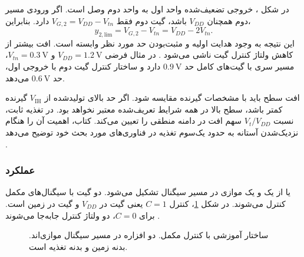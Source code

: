در شکل ، خروجی تضعیف‌شده واحد اول به
 واحد دوم وصل است. اگر ورودی مسیر دوم همچنان
\(V_{DD}\) باشد، گیت دوم فقط
\(V_{G,2}=V_{DD}-V_{tn}\) دارد. بنابراین،
\begin{equation}
 y_{2,\mathrm{lim}}=V_{G,2}-V_{tn}=V_{DD}-2V_{tn}.
 \label{eq:pass-gate-cascade}
\end{equation}
این نتیجه به وجود هدایت اولیه و مثبت‌بودن حد مورد نظر
وابسته است. افت بیشتر از کاهش ولتاژ کنترل گیت ناشی می‌شود
\cite[آغاز صفحه ۹۳]{weste}.
در مثال فرضی \(V_{DD}=\qty{1.2}{\volt}\) و
\(V_{tn}=\qty{0.3}{\volt}\)، مسیر سری با گیت‌های کامل حد
\(\qty{0.9}{\volt}\) دارد و ساختار کنترل گیت دوم با خروجی
اول، حد \(\qty{0.6}{\volt}\) می‌دهد.

افت سطح باید با مشخصات گیرنده مقایسه شود. اگر حد بالای
تولیدشده از \(V_{\mathrm{IH}}\) گیرنده کمتر باشد، سطح بالا
در همه شرایط تعریف‌شده معتبر نخواهد بود.
در تغذیه ثابت، نسبت \(V_t/V_{DD}\) سهم افت در دامنه منطقی
را تعیین می‌کند. کتاب، اهمیت آن را هنگام نزدیک‌شدن آستانه
به حدود یک‌سوم تغذیه در فناوری‌های مورد بحث خود توضیح
می‌دهد \cite[صفحه ۹۳]{weste}.

\subsubsection{عملکرد }
\label{sec:pass-transmission-gate}
 یا  از یک  و یک
 موازی در مسیر سیگنال تشکیل می‌شود. دو گیت با
سیگنال‌های مکمل کنترل می‌شوند. در شکل
\ref{fig:pass-transmission-gate}، کنترل \(C=1\) یعنی
گیت  در \(V_{DD}\) و گیت  در زمین است.
برای \(C=0\)، دو ولتاژ کنترل جابه‌جا می‌شوند
\cite[صفحه ۹۳ و بخش ]{weste}.
\begin{figure}[!htbp]
\centering
\begin{latin}
\PersianMathDigits
{}
\end{latin}
\caption{ساختار آموزشی  با کنترل مکمل.
دو افزاره در مسیر سیگنال موازی‌اند. بدنه  زمین و
بدنه  تغذیه است.}
\label{fig:pass-transmission-gate}
\end{figure}

